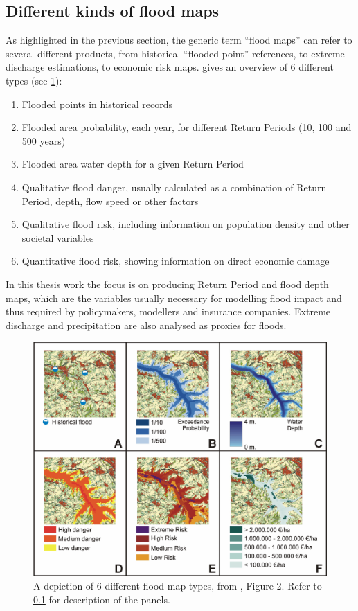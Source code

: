 \subsection{Different kinds of flood maps} \label{sec:flood_map_types}
As highlighted in the previous section, the generic term \enquote{flood maps} can refer to several different products, from historical ``flooded point'' references, to extreme discharge estimations, to economic risk maps. \citet{DeMoel2009} gives an overview of 6 different types (see \cref{fig:flood_map_types}):

\begin{enumerate}[label=\Alph*)] %
\item Flooded points in historical records
\item Flooded area probability, each year, for different Return Periods (10, 100 and 500 years)\label{enum:RP_map}
\item Flooded area water depth for a given Return Period
\item Qualitative flood danger, usually calculated as a combination of Return Period, depth, flow speed or other factors
\item Qualitative flood risk, including information on population density and other societal variables
\item Quantitative flood risk, showing information on direct economic damage
\end{enumerate}

In this thesis work the focus is on producing Return Period and flood depth maps, which are the variables usually necessary for modelling flood impact and thus required by policymakers, modellers and insurance companies. Extreme discharge and precipitation are also analysed as proxies for floods.

\begin{figure}
    \centering
    \includegraphics[width=\textwidth]{figures/flood_map_types}
    \decoRule
    \caption[Flood map types]{A depiction of 6 different flood map types, from  \citet{DeMoel2009}, Figure 2. Refer to \cref{sec:flood_map_types} for description of the panels.}
    \label{fig:flood_map_types}
\end{figure}



